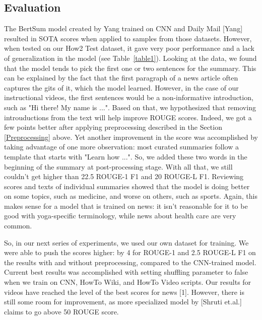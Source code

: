 \documentclass{article}
\begin{document}
\subsection{Evaluation}

The BertSum model created by Yang trained on CNN and Daily Mail [Yang] resulted in SOTA  scores when applied to samples from those datasets. However, when tested on our How2 Test dataset, it gave very poor performance and a lack of generalization in the model (see Table~\ref{table1}). Looking at the data, we found that the model tends to pick the first one or two sentences for the summary. This can be explained by the fact that the first paragraph of a news article often captures the gits of it, which the model learned. However, in the case of our instructional videos, the first sentences would be a non-informative introduction, such as "Hi there! My name is ...". Based on that, we hypothesized that removing introuductions from the text will help improve ROUGE scores. Indeed, we got a few points better after applying  preprocessing described in the Section \ref{Preprocessing} above. Yet another improvement in the score was accomplished by taking advantage of one more observation: most curated summaries follow a template that starts with "Learn how ...". So, we added these two words in the beginning of the summary at post-processing stage. With all that, we still couldn't get higher than 22.5 ROUGE-1 F1 and 20 ROUGE-L F1. Reviewing scores and texts of individual summaries showed that the model is doing better on some topics, such as medicine, and worse on others, such as sports. Again, this makes sense for a model that is trained on news: it isn't reasonable for it to be good with yoga-specific terminology, while news about health care are very common.

So, in our next series of experiments, we used our own dataset for training. We were able to push the scores higher: by 4 for ROUGE-1 and 2.5 ROUGE-L F1 on the results with and without preprocessing, compared to the CNN-trained model. Current best results was accomplished with setting shuffling parameter to false when we train on CNN, HowTo Wiki, and HowTo Video scripts. Our results for videos have reached the level of the best scores for news [1]. However, there is still some  room for improvement, as more specialized model by [Shruti et.al.] claims to go above 50 ROUGE score.
\end{document}
